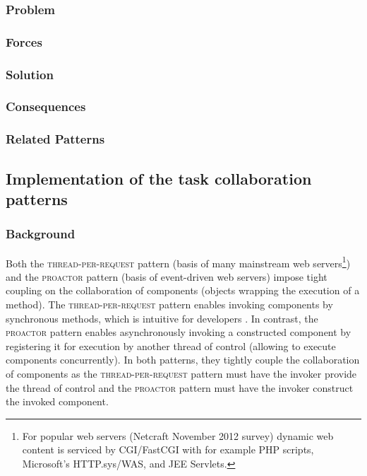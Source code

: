 \documentclass[prodmode]{style/acmlarge}
\begin{document}
\subsubsection*{Problem}

\subsubsection*{Forces}

\subsubsection*{Solution}

\subsubsection*{Consequences}

\subsubsection*{Related Patterns}



\subsection{Implementation of the task collaboration patterns}

\subsubsection*{Background}

Both the \textsc{thread-per-request} pattern \cite{thread-per-request} (basis of
many mainstream web servers\footnote{For popular web servers (Netcraft November
2012 survey) dynamic web content is serviced by CGI/FastCGI with for example PHP
scripts, Microsoft's HTTP.sys/WAS, and JEE Servlets.}) and the \textsc{proactor}
pattern \cite{proactor} (basis of event-driven web servers) impose tight
coupling on the collaboration of components (objects wrapping the execution of a
method).  The \textsc{thread-per-request} pattern enables invoking components by
synchronous methods, which is intuitive for developers \cite[p. 2]{proactor}. 
In contrast, the \textsc{proactor} pattern enables asynchronously invoking a
constructed component by registering it for execution by another thread of
control (allowing to execute components concurrently).  In both patterns, they
tightly couple the collaboration of components as the
\textsc{thread-per-request} pattern must have the invoker provide the thread of
control and the \textsc{proactor} pattern must have the invoker construct the
invoked component.
\end{document}
